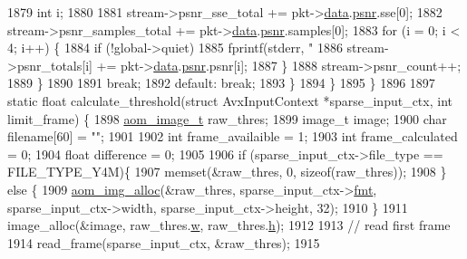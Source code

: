 \begin{DoxyCodeInclude}
{{{{{{{{{{{{{{{{{{{{{{{{{{{{{{{{{{{{{{{{{{{{1879         \textcolor{keywordtype}{int} i;
1880 
1881         stream->psnr\_sse\_total += pkt->\hyperlink{structaom__codec__cx__pkt_afb379cd4bfa7692d1d6e85f4e4b2b410}{data}.\hyperlink{structaom__codec__cx__pkt_a3a38e942aa0da463260a05eb05f51762}{psnr}.sse[0];
1882         stream->psnr\_samples\_total += pkt->\hyperlink{structaom__codec__cx__pkt_afb379cd4bfa7692d1d6e85f4e4b2b410}{data}.\hyperlink{structaom__codec__cx__pkt_a3a38e942aa0da463260a05eb05f51762}{psnr}.samples[0];
1883         \textcolor{keywordflow}{for} (i = 0; i < 4; i++) \{
1884           \textcolor{keywordflow}{if} (!global->quiet)
1885             fprintf(stderr, \textcolor{stringliteral}{"%
1886           stream->psnr\_totals[i] += pkt->\hyperlink{structaom__codec__cx__pkt_afb379cd4bfa7692d1d6e85f4e4b2b410}{data}.\hyperlink{structaom__codec__cx__pkt_a3a38e942aa0da463260a05eb05f51762}{psnr}.psnr[i];
1887         \}
1888         stream->psnr\_count++;
1889       \}
1890 
1891       \textcolor{keywordflow}{break};
1892     \textcolor{keywordflow}{default}: \textcolor{keywordflow}{break};
1893     \}
1894   \}
1895 \}
1896 
1897 \textcolor{keyword}{static} \textcolor{keywordtype}{float} calculate\_threshold(\textcolor{keyword}{struct} AvxInputContext *sparse\_input\_ctx, \textcolor{keywordtype}{int} limit\_frame) \{
1898   \hyperlink{structaom__image}{aom\_image\_t} raw\_thres;
1899   image\_t image;
1900   \textcolor{keywordtype}{char} filename[60] = \textcolor{stringliteral}{""};
1901 
1902   \textcolor{keywordtype}{int} frame\_availaible = 1;
1903   \textcolor{keywordtype}{int} frame\_calculated = 0;
1904   \textcolor{keywordtype}{float} difference = 0;
1905 
1906   \textcolor{keywordflow}{if} (sparse\_input\_ctx->file\_type == FILE\_TYPE\_Y4M)\{
1907     memset(&raw\_thres, 0, \textcolor{keyword}{sizeof}(raw\_thres));
1908   \} \textcolor{keywordflow}{else} \{
1909     \hyperlink{aom__image_8h_a570db29fbd122951235a08fe9375f6bb}{aom\_img\_alloc}(&raw\_thres, sparse\_input\_ctx->\hyperlink{structaom__image_a6c64b1ab918d80d52eb8f5d6d957e825}{fmt}, sparse\_input\_ctx->width, 
      sparse\_input\_ctx->height, 32);
1910   \}
1911   image\_alloc(&image, raw\_thres.\hyperlink{structaom__image_a695141e492ab146dc15e8131827eb237}{w}, raw\_thres.\hyperlink{structaom__image_a3fcffff0a25a4fd9218ed38842014ef2}{h});
1912 
1913   \textcolor{comment}{// read first frame}
1914   read\_frame(sparse\_input\_ctx, &raw\_thres);
1915 
}}}}}}}}}}}}}}}}}}}}}}}}}}}}}}}}}}}}}}}}}}}}}
\end{DoxyCodeInclude}
